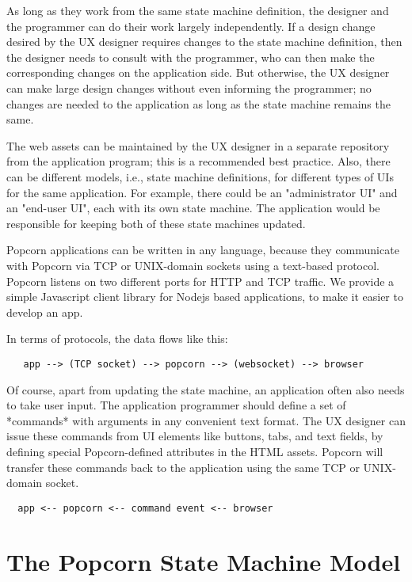 \documentclass[12pt]{article}
\begin{document}
As long as they work from the same state machine definition, the
designer and the programmer can do their work largely independently.
If a design change desired by the UX designer requires changes to the
state machine definition, then the designer needs to consult with the
programmer, who can then make the corresponding changes on the
application side. But otherwise, the UX designer can make large design
changes without even informing the programmer; no changes are needed
to the application as long as the state machine remains the same.

The web assets can be maintained by the UX designer in a separate
repository from the application program; this is a recommended best
practice.  Also, there can be different models, i.e., state machine
definitions, for different types of UIs for the same application. For
example, there could be an "administrator UI" and an "end-user UI",
each with its own state machine. The application would be responsible
for keeping both of these state machines updated.

Popcorn applications can be written in any language, because they
communicate with Popcorn via TCP or UNIX-domain sockets using a
text-based protocol. Popcorn listens on two different ports for HTTP
and TCP traffic.  We provide a simple Javascript client library for
Nodejs based applications, to make it easier to develop an app.

In terms of protocols, the data flows like this:

\begin{verbatim}
   app --> (TCP socket) --> popcorn --> (websocket) --> browser
\end{verbatim}

Of course, apart from updating the state machine, an application often
also needs to take user input. The application programmer should
define a set of *commands* with arguments in any convenient text
format. The UX designer can issue these commands from UI elements like
buttons, tabs, and text fields, by defining special Popcorn-defined
attributes in the HTML assets. Popcorn will transfer these commands
back to the application using the same TCP or UNIX-domain socket.

\begin{verbatim}
  app <-- popcorn <-- command event <-- browser
\end{verbatim}

\section{The Popcorn State Machine Model}
\end{document}
